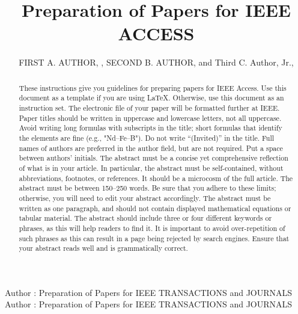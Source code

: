 \documentclass{ieeeaccess}
\begin{document}

\title{Preparation of Papers for IEEE ACCESS}
\author{\uppercase{First A. Author}, ,
\uppercase{Second B. Author}, and Third C. Author,
Jr.,
}

\address[1]{National Institute of Standards and
Technology, Boulder, CO 80305 USA (e-mail: author@boulder.nist.gov)}
\address[2]{Department of Physics, Colorado State University, Fort Collins,
CO 80523 USA (e-mail: author@lamar.colostate.edu)}
\address[3]{Electrical Engineering Department, University of Colorado, Boulder, CO
80309 USA}

\markboth
{Author \headeretal: Preparation of Papers for IEEE TRANSACTIONS and JOURNALS}
{Author \headeretal: Preparation of Papers for IEEE TRANSACTIONS and JOURNALS}



\begin{abstract}
These instructions give you guidelines for preparing papers for
IEEE Access. Use this document as a template if you are
using \LaTeX. Otherwise, use this document as an
instruction set. The electronic file of your paper will be formatted further
at IEEE. Paper titles should be written in uppercase and lowercase letters,
not all uppercase. Avoid writing long formulas with subscripts in the title;
short formulas that identify the elements are fine (e.g., "Nd--Fe--B"). Do
not write ``(Invited)'' in the title. Full names of authors are preferred in
the author field, but are not required. Put a space between authors'
initials. The abstract must be a concise yet comprehensive reflection of
what is in your article. In particular, the abstract must be self-contained,
without abbreviations, footnotes, or references. It should be a microcosm of
the full article. The abstract must be between 150--250 words. Be sure that
you adhere to these limits; otherwise, you will need to edit your abstract
accordingly. The abstract must be written as one paragraph, and should not
contain displayed mathematical equations or tabular material. The abstract
should include three or four different keywords or phrases, as this will
help readers to find it. It is important to avoid over-repetition of such
phrases as this can result in a page being rejected by search engines.
Ensure that your abstract reads well and is grammatically correct.
\end{abstract}
\end{document}
